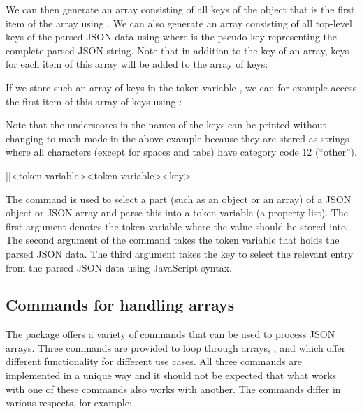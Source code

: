 \documentclass[a4paper]{article}
\begin{document}
{{We can then generate an array consisting of all keys of the object that is the first item of the array using . We can also generate an array consisting of all top-level keys of the parsed JSON data using  where  is the pseudo key representing the complete parsed JSON string. Note that in addition to the key of an array, keys for each item of this array will be added to the array of keys:

\begin{codeexamplecolumns}

\end{codeexamplecolumns}

If we store such an array of keys in the token variable \macro{\myJSONkeys}, we can for example access the first item of this array of keys using \macro{\JSONParseValue{\myJSONkeys}{[0]}}:

\begin{codeexamplecolumns}
\JSONParseValue{\myJSONkeys}{[0]}
\end{codeexamplecolumns}

Note that the underscores in the names of the keys can be printed without changing to math mode in the above example because they are stored as strings where all characters (except for spaces and tabs) have category code 12 (``other'').

\begin{macrodef}
|\JSONParseFilter|{<token variable>}{<token variable>}{<key>}
\end{macrodef}
The command \macro{\JSONParseFilter} is used to select a part (such as an object or an array) of a JSON object or JSON array and parse this into a token variable (a property list). The first argument denotes the token variable where the value should be stored into. The second argument of the command takes the token variable that holds the parsed JSON data. The third argument takes the key to select the relevant entry from the parsed JSON data using JavaScript syntax.

\subsection{Commands for handling arrays}

The package offers a variety of commands that can be used to process JSON arrays. Three commands are provided to loop through arrays, \macro{\JSONParseArrayUse}, \macro{\JSONParseArrayMapFunction} and \macro{\JSONParseArrayMapInline} which offer different functionality for different use cases. All three commands are implemented in a unique way and it should not be expected that what works with one of these commands also works with another. The commands differ in various respects, for example:

}}
\end{document}
